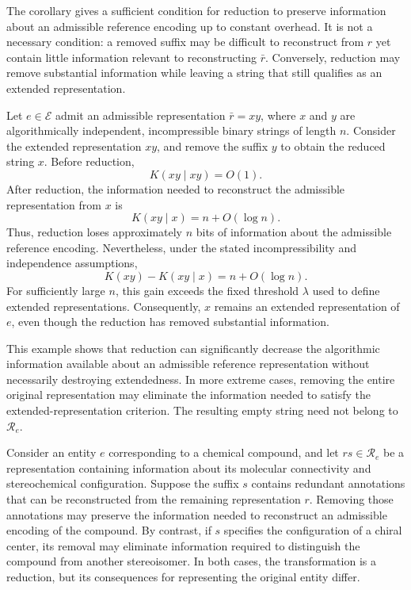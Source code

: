 The corollary gives a sufficient condition for reduction to preserve information about an admissible reference encoding up to constant overhead. It is not a necessary condition: a removed suffix may be difficult to reconstruct from $r$ yet contain little information relevant to reconstructing $\bar r$. Conversely, reduction may remove substantial information while leaving a string that still qualifies as an extended representation.

\begin{example}
Let $e\in\mathcal{E}$ admit an admissible representation $\bar r=xy$, where $x$ and $y$ are algorithmically independent, incompressible binary strings of length $n$. Consider the extended representation $xy$, and remove the suffix $y$ to obtain the reduced string $x$. Before reduction,
\[
K(xy\mid xy)=O(1).
\]
After reduction, the information needed to reconstruct the admissible representation from $x$ is
\[
K(xy\mid x)=n+O(\log n).
\]
Thus, reduction loses approximately $n$ bits of information about the admissible reference encoding. Nevertheless, under the stated incompressibility and independence assumptions,
\[
K(xy)-K(xy\mid x)=n+O(\log n).
\]
For sufficiently large $n$, this gain exceeds the fixed threshold $\lambda$ used to define extended representations. Consequently, $x$ remains an extended representation of $e$, even though the reduction has removed substantial information.
\end{example}

This example shows that reduction can significantly decrease the algorithmic information available about an admissible reference representation without necessarily destroying extendedness. In more extreme cases, removing the entire original representation may eliminate the information needed to satisfy the extended-representation criterion. The resulting empty string need not belong to $\mathcal{R}_e$.

\begin{example}
Consider an entity $e$ corresponding to a chemical compound, and let $rs\in\mathcal{R}_e$ be a representation containing information about its molecular connectivity and stereochemical configuration. Suppose the suffix $s$ contains redundant annotations that can be reconstructed from the remaining representation $r$. Removing those annotations may preserve the information needed to reconstruct an admissible encoding of the compound. By contrast, if $s$ specifies the configuration of a chiral center, its removal may eliminate information required to distinguish the compound from another stereoisomer. In both cases, the transformation is a reduction, but its consequences for representing the original entity differ.
\end{example}

